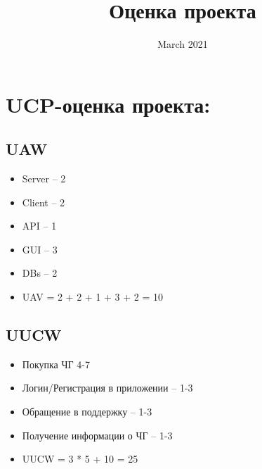 \documentclass{article}
\title{Оценка проекта}
\date{March 2021}
\begin{document}
\maketitle

\section*{UCP-оценка проекта:}

\subsection*{UAW}
\begin{itemize}
  \item Server -- 2
  \item Client -- 2
  \item API -- 1
  \item GUI -- 3
  \item DBs -- 2
  \item UAV =  2 + 2 + 1 + 3 + 2 = 10
\end{itemize}

\subsection*{UUCW}
\begin{itemize}
    \item Покупка ЧГ 4-7
    \item Логин/Регистрация в приложении -- 1-3
    \item Обращение в поддержку -- 1-3
    \item Получение информации о ЧГ --  1-3
    \item UUCW = 3 * 5 + 10 = 25
\end{itemize}
\end{document}
